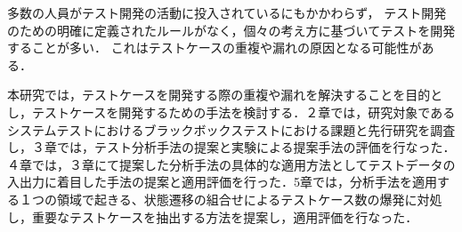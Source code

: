\documentclass[a4paper,12pt]{jreport}
\begin{document}
多数の人員がテスト開発の活動に投入されているにもかかわらず， テスト開発のための明確に定義されたルールがなく，個々の考え方に基づいてテストを開発することが多い．
これはテストケースの重複や漏れの原因となる可能性がある．

 本研究では，テストケースを開発する際の重複や漏れを解決することを目的とし，テストケースを開発するための手法を検討する．２章では，研究対象であるシステムテストにおけるブラックボックステストにおける課題と先行研究を調査し，３章では，テスト分析手法の提案と実験による提案手法の評価を行なった．４章では，３章にて提案した分析手法の具体的な適用方法としてテストデータの入出力に着目した手法の提案と適用評価を行った．5章では，分析手法を適用する１つの領域で起きる、状態遷移の組合せによるテストケース数の爆発に対処し，重要なテストケースを抽出する方法を提案し，適用評価を行なった．
\end{document}
